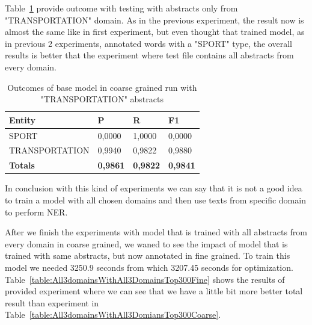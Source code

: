 \documentclass[thesis=M,english]{FITthesis}[2018/05/30]
\begin{document}
	Table~\ref{table:All3domainsWithTransportationTop300Coarse} provide outcome with testing with abstracts only from "TRANSPORTATION" domain. As in the previous experiment, the result now is almost the same like in first experiment, but even thought that trained model, as in previous 2 experiments, annotated words with a "SPORT" type, the overall results is better that the experiment where test file contains all abstracts from every domain. 
	
	\begin{table}[H]\centering
		\begin{tabular}{|l|l|l|l|}
			\hline {\textbf{Entity}} & {\textbf{P}} & {\textbf{R}} & {\textbf{F1}}\\\hline
				SPORT & 0,0000 & 1,0000 & 0,0000\\
				TRANSPORTATION & 0,9940 & 0,9822 & 0,9880\\\hline
				\textbf{Totals} & \textbf{0,9861} & \textbf{0,9822} & \textbf{0,9841}\\\hline
		\end{tabular}
	\caption{Outcomes of base model in coarse grained run with "TRANSPORTATION" abstracts \label{table:All3domainsWithTransportationTop300Coarse}}
	\end{table}	
	
	In conclusion with this kind of experiments we can say that it is not a good idea to train a model with all chosen domains and then use texts from specific domain to perform NER.
	
	After we finish the experiments with model that is trained with all abstracts from every domain in coarse grained, we waned to see the impact of model that is trained with same abstracts, but now annotated in fine grained. To train this model we needed 3250.9 seconds from which 3207.45 seconds for optimization. Table~\ref{table:All3domainsWithAll3DomainsTop300Fine} shows the results of provided experiment where we can see that we have a little bit more better total result than experiment in Table~\ref{table:All3domainsWithAll3DomiansTop300Coarse}.
\end{document}
